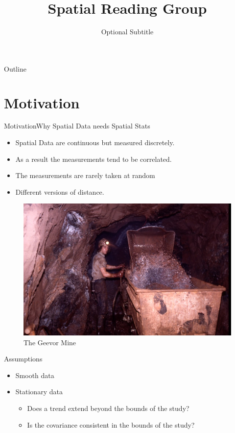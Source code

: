 \documentclass{beamer}
\title{Spatial Reading Group}
\subtitle{Optional Subtitle}
\begin{document}
\begin{frame}
  \titlepage
\end{frame}

\begin{frame}{Outline}
  \tableofcontents
\end{frame}

\section{Motivation}


\begin{frame}{Motivation}{Why Spatial Data needs Spatial Stats}
  \begin{itemize}
  	\item {
   		Spatial Data are continuous but measured discretely.
 	}
    \item {
 		As a result the measurements tend to be correlated.
 	}
 	\item {
  		The measurements are rarely taken at random
  	}
    \item{
    	Different versions of distance.
    }
	\end{itemize}
	\begin{figure}
	\centering
		\includegraphics[scale = 0.8]{Images/Geevor_Tin.jpg}
		\caption{ { \scriptsize The Geevor Mine}}
	\end{figure}    
\end{frame}

\begin{frame}{Assumptions}{}
  \begin{itemize}
  \item {
    Smooth data
  }
  \item {
    Stationary data
	\begin{itemize}
   		\item Does a trend extend beyond the bounds of the study?
   		\item Is the covariance consistent in the bounds of the study?
    \end{itemize}
  }
  \end{itemize}
\end{frame}
\end{document}
